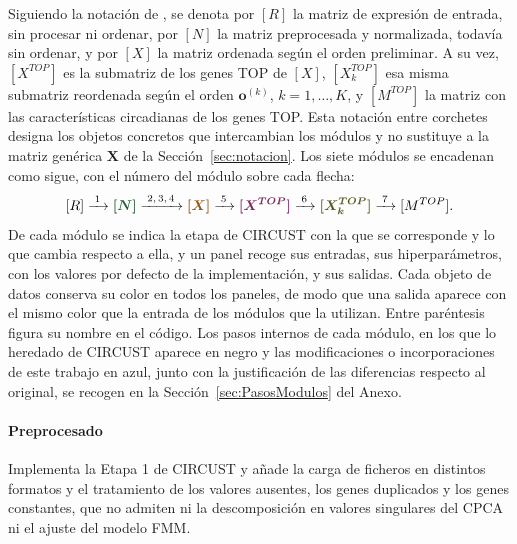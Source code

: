\documentclass[12pt, a4paper]{report}
\newcommand{\nuevo}[1]{\textcolor{cnuevo}{#1}}
\newcommand{\datom}[2]{\textcolor{#1}{\boldsymbol{#2}}} %
\begin{document}
Siguiendo la notación de \citet{larriba2023}, se denota por \([R]\) la matriz de expresión de entrada, sin procesar ni ordenar, por \([N]\) la matriz preprocesada y normalizada, todavía sin ordenar, y por \([X]\) la matriz ordenada según el orden preliminar. A su vez, \([X^{TOP}]\) es la submatriz de los genes TOP de \([X]\), \([X^{TOP}_k]\) esa misma submatriz reordenada según el orden \(\mathbf{o}^{(k)}\), \(k=1,\ldots,K\), y \([M^{TOP}]\) la matriz con las características circadianas de los genes TOP. Esta notación entre corchetes designa los objetos concretos que intercambian los módulos y no sustituye a la matriz genérica \(\mathbf{X}\) de la Sección~\ref{sec:notacion}. Los siete módulos se encadenan como sigue, con el número del módulo sobre cada flecha:
\[
[R]\xrightarrow{\;1\;}\datom{dN}{[N]}\xrightarrow{\;2,\,3,\,4\;}\datom{dX}{[X]}\xrightarrow{\;5\;}\datom{dT}{[X^{TOP}]}\xrightarrow{\;6\;}\datom{dK}{[X^{TOP}_k]}\xrightarrow{\;7\;}[M^{TOP}].
\]
De cada módulo se indica la etapa de CIRCUST con la que se corresponde y lo que cambia respecto a ella, y un panel recoge sus entradas, sus hiperparámetros, con los valores por defecto de la implementación, y sus salidas. Cada objeto de datos conserva su color en todos los paneles, de modo que una salida aparece con el mismo color que la entrada de los módulos que la utilizan. Entre paréntesis figura su nombre en el código. Los pasos internos de cada módulo, en los que lo heredado de CIRCUST aparece en negro y las modificaciones o incorporaciones de este trabajo en \nuevo{azul}, junto con la justificación de las diferencias respecto al original, se recogen en la Sección~\ref{sec:PasosModulos} del Anexo.

\paragraph{Preprocesado}
Implementa la Etapa 1 de CIRCUST y añade la carga de ficheros en distintos formatos y el tratamiento de los valores ausentes, los genes duplicados y los genes constantes, que no admiten ni la descomposición en valores singulares del CPCA ni el ajuste del modelo FMM.
\end{document}
